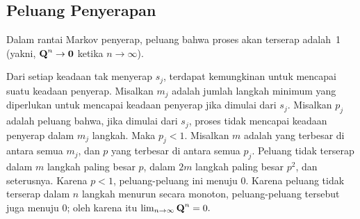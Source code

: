 \subsection*{Peluang Penyerapan}
\begin{theorem}\label{thm 11.2.1}
Dalam rantai Markov penyerap, peluang bahwa proses akan terserap adalah~1
(yakni, ${\mbox{\bf Q}\/}^n \to {\mbox{\bf0}\/}$ ketika $n \to \infty$).

\proof
Dari setiap keadaan tak menyerap $s_j$, terdapat kemungkinan untuk mencapai
suatu keadaan penyerap. Misalkan $m_j$ adalah jumlah langkah minimum yang
diperlukan untuk mencapai keadaan penyerap jika dimulai dari $s_j$. Misalkan
$p_j$ adalah peluang bahwa, jika dimulai dari $s_j$, proses tidak mencapai
keadaan penyerap dalam $m_j$ langkah. Maka $p_j <1$. Misalkan $m$ adalah yang
terbesar di antara semua $m_j$, dan $p$ yang terbesar di antara semua $p_j$.
Peluang tidak terserap dalam $m$ langkah paling besar $p$, dalam $2m$ langkah
paling besar $p^2$, dan seterusnya. Karena $p<1$, peluang-peluang ini menuju 0.
Karena peluang tidak terserap dalam $n$ langkah menurun secara monoton,
peluang-peluang tersebut juga menuju 0; oleh karena itu
$\lim_{n \rightarrow \infty } {\mbox{\bf Q}\/}^n = 0.$
\end{theorem}

